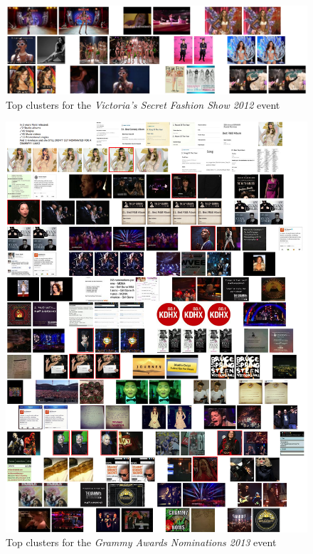 \begin{figure}[h!]
  \centering
  \includegraphics[width=1.0\linewidth]{./vsfashionshow_clusters.png}
  \caption{Top clusters for the \emph{Victoria's Secret Fashion Show 2012} event}
  \label{fig:topvsfashionshow}
\end{figure}

\begin{figure}[h!]
  \centering
  \includegraphics[width=1.0\linewidth]{./grammy_clusters.png}
  \caption{Top clusters for the \emph{Grammy Awards Nominations 2013} event}
  \label{fig:topgrammy}
\end{figure}

